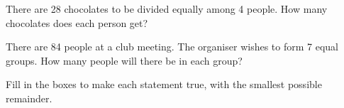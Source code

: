 \begin{exercises}
\begin{questions}
        \Question[2] There are 28 chocolates to be divided equally among 4 people. How many chocolates does each person get?
            \begin{solutionordottedlines}[1in]
            \end{solutionordottedlines}
        \Question[2] There are 84 people at a club meeting. The organiser wishes to form 7 equal groups. How many people will there be in each group?
            \begin{solutionordottedlines}[1in]
            \end{solutionordottedlines}
        \Question[6] Fill in the boxes to make each statement true, with the smallest possible remainder.
\end{questions}
\end{exercises}
